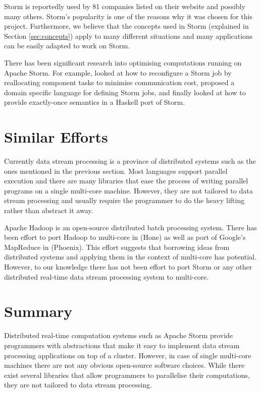 \documentclass[bsc,twoside,singlespacing,normalheadings,parskip]{infthesis}\usepackage[]{graphicx}\usepackage[]{color}
\begin{document}
Storm is reportedly used by 81 companies listed on their website \cite{PoweredBy} and possibly many others. Storm's popularity is one of the reasons why it was chosen for this project. Furthermore, we believe that the concepts used in Storm (explained in Section \ref{sec:concepts}) apply to many different situations and many applications can be easily adapted to work on Storm.

There has been significant research into optimising computations running on Apache Storm. For example, \cite{Chatzistergiou:2014:FHN:2661829.2661882} looked at how to reconfigure a Storm job by reallocating component tasks to minimise communication cost, \cite{DBLP:conf/fedcsis/ChandrasekaranSA14} proposed a domain specific language for defining Storm jobs, and finally \cite{dimsonhailstorm} looked at how to provide exactly-once semantics in a Haskell port of Storm.

\section{Similar Efforts}
\label{sec:similar_efforts}

Currently data stream processing is a province of distributed systems such as the ones mentioned in the previous section. Most languages support parallel execution and there are many libraries that ease the process of writing parallel programs on a single multi-core machine. However, they are not tailored to data stream processing and usually require the programmer to do the heavy lifting rather than abstract it away.

Apache Hadoop is an open-source distributed batch processing system. There has been effort to port Hadoop to multi-core in \citep{Kumar:2013:HSD:2536274.2536314} (Hone) as well as port of Google's MapReduce in \citep{ranger2007evaluating} (Phoenix). This effort suggests that borrowing ideas from distributed systems and applying them in the context of multi-core has potential. However, to our knowledge there has not been effort to port Storm or any other distributed real-time data stream processing system to multi-core.

\section{Summary}

Distributed real-time computation systems such as Apache Storm provide programmers with abstractions that make it easy to implement data stream processing applications on top of a cluster. However, in case of single multi-core machines there are not any obvious open-source software choices. While there exist several libraries that allow programmers to parallelise their computations, they are not tailored to data stream processing.
\clearpage{}
\end{document}
